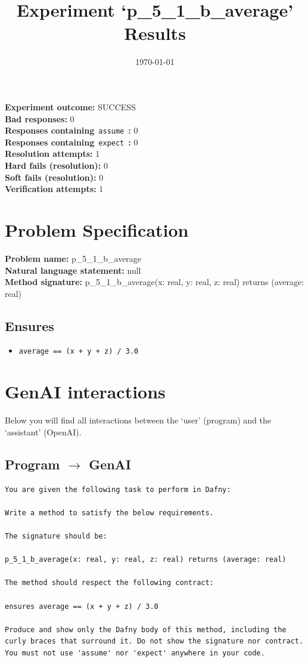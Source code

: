 \documentclass{article}
\begin{document}
\title{Experiment `p\_5\_1\_b\_average' Results}
\author{\today}
\date{}
\maketitle
\textbf{Experiment outcome: }SUCCESS
\\\textbf{Bad responses: }0
\\\textbf{Responses containing}~\texttt{assume}~\textbf{: }0
\\\textbf{Responses containing}~\texttt{expect}~\textbf{: }0
\\\textbf{Resolution attempts: }1
\\\textbf{Hard fails (resolution): }0
\\\textbf{Soft fails (resolution): }0
\\\textbf{Verification attempts: }1
\section*{Problem Specification}
\textbf{Problem name: }p\_5\_1\_b\_average
\\\textbf{Natural language statement: }null
\\\textbf{Method signature: }p\_5\_1\_b\_average(x: real, y: real, z: real) returns (average: real)
\subsection*{Ensures}
\begin{itemize}
\item \texttt{average == (x + y + z) / 3.0}
\end{itemize}
\clearpage
\section*{GenAI interactions}
Below you will find all interactions between the `user' (program) and the `assistant' (OpenAI).
\subsection*{Program $\rightarrow$ GenAI}
\begin{lstlisting}
You are given the following task to perform in Dafny:

Write a method to satisfy the below requirements.

The signature should be:

p_5_1_b_average(x: real, y: real, z: real) returns (average: real)

The method should respect the following contract:

ensures average == (x + y + z) / 3.0

Produce and show only the Dafny body of this method, including the curly braces that surround it. Do not show the signature nor contract. You must not use 'assume' nor 'expect' anywhere in your code.
\end{lstlisting}
\end{document}
